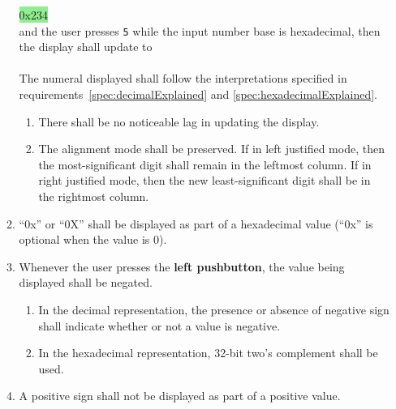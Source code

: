 \begin{enumerate}
\begin{enumerate}
{                \colorbox{LightGreen}{\phantom{xxxxxxxxxxx}0x234}
            } \\
            and the user presses \texttt{5} while the input number base is hexadecimal, then the display shall update to \\
             \\
            The numeral displayed shall follow the interpretations specified in requirements~\ref{spec:decimalExplained} and \ref{spec:hexadecimalExplained}.
            \begin{enumerate}
                \item There shall be no noticeable lag in updating the display.
                \item The alignment mode shall be preserved.
                    If in left justified mode, then the most-significant digit shall remain in the leftmost column.
                    If in right justified mode, then the new least-significant digit shall be in the rightmost column.
            \end{enumerate}
        \item ``0x'' or ``0X'' shall be displayed as part of a hexadecimal value (``0x'' is optional when the value is 0).
        \item Whenever the user presses the \textbf{left pushbutton}, the value being displayed shall be negated.
            \begin{enumerate}
                \item In the decimal representation, the presence or absence of negative sign shall indicate whether or not a value is negative.
                \item In the hexadecimal representation, 32-bit two's complement shall be used.
            \end{enumerate}
        \item A positive sign shall not be displayed as part of a positive value.

\end{enumerate}
\end{enumerate}
